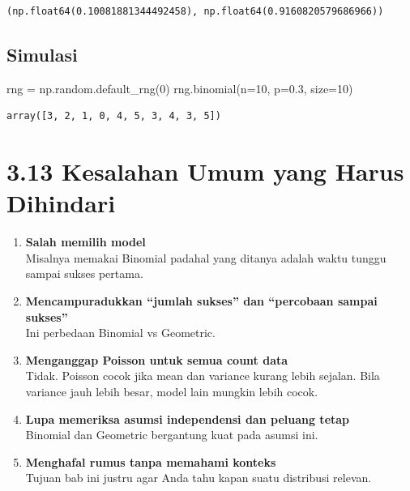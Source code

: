 \documentclass[
  letterpaper,
  DIV=11,
  numbers=noendperiod]{scrreprt}
\newenvironment{Shaded}{\begin{snugshade}}{\end{snugshade}}
\newcommand{\DecValTok}[1]{\textcolor[rgb]{0.68,0.00,0.00}{#1}}
\newcommand{\FloatTok}[1]{\textcolor[rgb]{0.68,0.00,0.00}{#1}}
\newcommand{\NormalTok}[1]{\textcolor[rgb]{0.00,0.23,0.31}{#1}}
\newcommand{\OperatorTok}[1]{\textcolor[rgb]{0.37,0.37,0.37}{#1}}
\begin{document}
\begin{verbatim}
(np.float64(0.10081881344492458), np.float64(0.9160820579686966))
\end{verbatim}

\subsection{Simulasi}\label{simulasi}

\begin{Shaded}
\begin{Highlighting}[]
\NormalTok{rng }\OperatorTok{=}\NormalTok{ np.random.default\_rng(}\DecValTok{0}\NormalTok{)}
\NormalTok{rng.binomial(n}\OperatorTok{=}\DecValTok{10}\NormalTok{, p}\OperatorTok{=}\FloatTok{0.3}\NormalTok{, size}\OperatorTok{=}\DecValTok{10}\NormalTok{)}
\end{Highlighting}
\end{Shaded}

\begin{verbatim}
array([3, 2, 1, 0, 4, 5, 3, 4, 3, 5])
\end{verbatim}

\section{3.13 Kesalahan Umum yang Harus
Dihindari}\label{kesalahan-umum-yang-harus-dihindari}

\begin{enumerate}
\def\labelenumi{\arabic{enumi}.}
\item
  \textbf{Salah memilih model}\\
  Misalnya memakai Binomial padahal yang ditanya adalah waktu tunggu
  sampai sukses pertama.
\item
  \textbf{Mencampuradukkan ``jumlah sukses'' dan ``percobaan sampai
  sukses''}\\
  Ini perbedaan Binomial vs Geometric.
\item
  \textbf{Menganggap Poisson untuk semua count data}\\
  Tidak. Poisson cocok jika mean dan variance kurang lebih sejalan. Bila
  variance jauh lebih besar, model lain mungkin lebih cocok.
\item
  \textbf{Lupa memeriksa asumsi independensi dan peluang tetap}\\
  Binomial dan Geometric bergantung kuat pada asumsi ini.
\item
  \textbf{Menghafal rumus tanpa memahami konteks}\\
  Tujuan bab ini justru agar Anda tahu kapan suatu distribusi relevan.
\end{enumerate}
\end{document}
